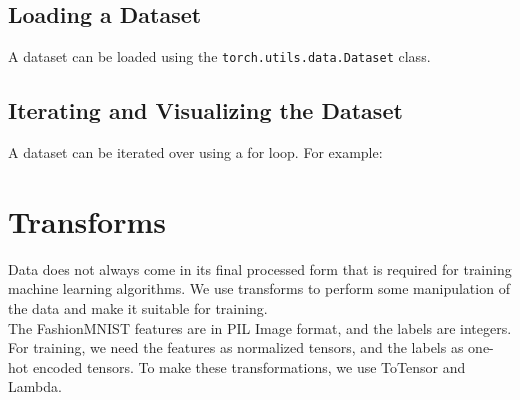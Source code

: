 \documentclass{article}
\begin{document}
\subsection{Loading a Dataset}

A dataset can be loaded using the \texttt{torch.utils.data.Dataset} class.

\subsection{Iterating and Visualizing the Dataset}

A dataset can be iterated over using a for loop. For example:

\section{Transforms}

Data does not always come in its final processed form that is required for 
training machine learning algorithms. We use transforms to perform some 
manipulation of the data and make it suitable for training. \\

The FashionMNIST features are in PIL Image format, and the labels are integers. 
For training, we need the features as normalized tensors, and the labels as 
one-hot encoded tensors. To make these transformations, we use ToTensor and 
Lambda.
\end{document}
